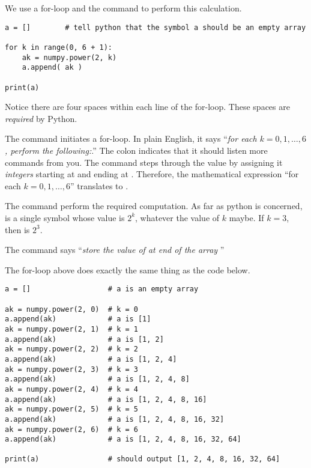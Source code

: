 \documentclass[../main.tex]{subfiles}
\begin{document}
\begin{enumerate}
    We use a for-loop and the  command to perform this calculation.

    \begin{verbatim}
a = []        # tell python that the symbol a should be an empty array

for k in range(0, 6 + 1):  
    ak = numpy.power(2, k)
    a.append( ak )

print(a)
    \end{verbatim}
    \faExclamationTriangle{} Notice there are four spaces within each line of the for-loop. These spaces are \emph{required} by Python.

    The command  initiates a for-loop. In plain English, it says ``\emph{for each \(k = 0, 1, \ldots, 6\), perform the following:}.''  The colon indicates that it should listen more commands from you.   The  command steps through the value  by assigning it \emph{integers} starting at  and ending at .  Therefore, the mathematical expression ``for each \(k = 0, 1, \ldots, 6\)'' translates to .

    The command  perform the required computation. As far as python is concerned,  is a single symbol whose value is \(2^{k}\), whatever the value of \(k\) maybe.  If \(k = 3\), then  is \(2^{3}\). 

    The command  says ``\emph{store the value of  at end of the array }''

    The for-loop above does exactly the same thing as the code below.
    \begin{verbatim}
a = []                  # a is an empty array

ak = numpy.power(2, 0)  # k = 0
a.append(ak)            # a is [1]
ak = numpy.power(2, 1)  # k = 1
a.append(ak)            # a is [1, 2]
ak = numpy.power(2, 2)  # k = 2
a.append(ak)            # a is [1, 2, 4]
ak = numpy.power(2, 3)  # k = 3
a.append(ak)            # a is [1, 2, 4, 8]
ak = numpy.power(2, 4)  # k = 4
a.append(ak)            # a is [1, 2, 4, 8, 16]
ak = numpy.power(2, 5)  # k = 5
a.append(ak)            # a is [1, 2, 4, 8, 16, 32]
ak = numpy.power(2, 6)  # k = 6
a.append(ak)            # a is [1, 2, 4, 8, 16, 32, 64]

print(a)                # should output [1, 2, 4, 8, 16, 32, 64]
    \end{verbatim}

\end{enumerate}
\end{document}
